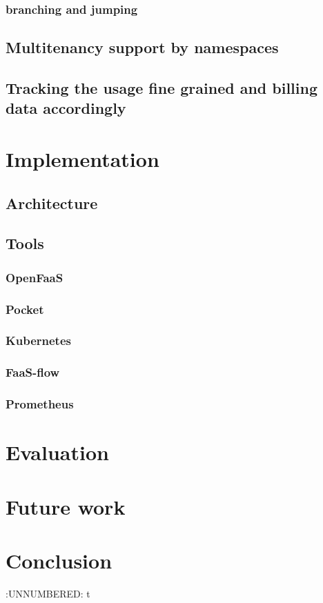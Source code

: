 \documentclass[12pt]{article}
\begin{document}
\subsubsection{branching and jumping}
\label{sec:orga5d4a57}
\subsection{Multitenancy support by namespaces}
\label{sec:org4d6d82d}
\subsection{Tracking the usage fine grained and billing data accordingly}
\label{sec:orgfe041a9}
\section{Implementation}
\label{sec:org23de03f}
\subsection{Architecture}
\label{sec:org0562b53}
\subsection{Tools}
\label{sec:org87cc4fe}
\subsubsection{OpenFaaS}
\label{sec:org3f9c223}
\subsubsection{Pocket}
\label{sec:orgbc71179}
\subsubsection{Kubernetes}
\label{sec:orgca10f71}
\subsubsection{FaaS-flow}
\label{sec:org66d8502}
\subsubsection{Prometheus}
\label{sec:orgd719932}
\section{Evaluation}
\label{sec:org794aee8}
\section{Future work}
\label{sec:org0e3560c}
\section{Conclusion}
\label{sec:org3e45d1c}


:UNNUMBERED: t
\end{document}
